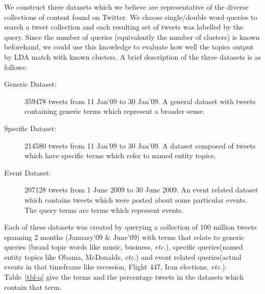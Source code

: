 \documentclass[10pt,a5paper,twoside]{article}
\begin{document}
We construct three datasets which we believe are representative of the
diverse collections of content found on Twitter.  We choose
single/double word queries to search a tweet collection and each
resulting set of tweets was labelled by the query. Since the number of
queries (equivalently the number of clusters) is known beforehand, we
could use this knowledge to evaluate how well the topics output by LDA
match with known clusters. A brief description of the three datasets
is as follows:\vspace{-5pt}
\begin{description}
\item[Generic Dataset: ]
 359478 tweets from 11 Jan'09 to 30 Jan'09.
A general dataset with tweets containing generic terms which represent a broader sense.\vspace{-5pt}
\item[Specific Dataset: ]
214580 tweets from 11 Jan'09 to 30 Jan'09.
A dataset composed of tweets which have specific terms which refer to named entity topics.\vspace{-5pt}
\item[Event Dataset: ]
207128 tweets from 1 June 2009 to 30 June 2009.
An event related dataset which contains tweets which were posted about some particular events. The query terms are terms which represent events.\vspace{-5pt}
\end{description}
Each of these datasets was created by querying a collection of 100
million tweets spanning 2 months (January'09 \& June'09) with terms
that relate to generic queries (broad topic words like music,
business, {\it etc.}), specific queries(named entity topics like
Obama, McDonalds, {\it etc.}) and event related queries(actual events
in that timeframe like recession, Flight 447, Iran elections, {\it
  etc.}).  Table~\ref{tbl-q} give the terms and the percentage tweets
in the datasets which contain that term.
\end{document}
